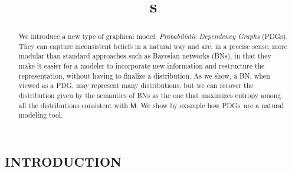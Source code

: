 \documentclass{article}
\title{\ModelName s}
\author{} %
\newcommand{\commentout}[1]{\ignorespaces}
\newcommand{\sfM}{\mathsf M}
\newcommand{\ModelName}{Probabilistic Dependency Graph}
\newcommand{\MN}{PDG}
\newcommand{\MNs}{\MN s}
\numberwithin{equation}{section}
\begin{document}
\begin{notfocus}
	\maketitle
	
	\begin{abstract}
		We introduce a new type of graphical model, \emph{\ModelName s} (\MNs).  
		They can capture inconsistent beliefs in a natural way and are, in a precise sense, more modular than standard
		approaches such as Bayesian networks (BNs), 
		in that they make it easier for	a modeler to incorporate new information 
		\commentout{without having to restructure
			the representation of current information.}
		and restructure the representation, without having to
		finalize a distribution. 
		\commentout{As we show, when viewed as a \MN, a BN $G$
			represents many}
		As we show, a BN, when viewed as a \MN,
		may represent many 
		distributions, but we can recover the distribution given by the
		semantics of BNs as 
		the one that maximizes entropy among all the distributions consistent
		with $\sfM$.  
		We show by example how \MNs\ are a natural modeling tool.
	\end{abstract}


	\section{INTRODUCTION}

	\commentout{We introduce the \ModelName\ (\MN), a directed graphical model for specifying local beliefs. They are strictly more expressive and modular than existing directed graphical models, and in particular this allows them represent inconsistent belief states.
	
}
\end{notfocus}
\end{document}
